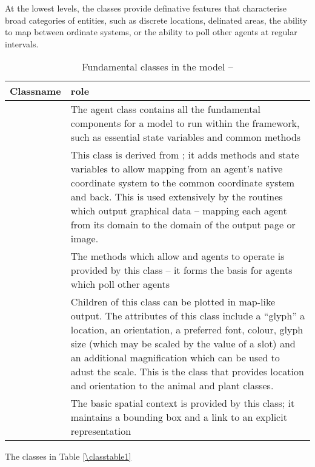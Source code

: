 At the lowest levels, the classes provide definative features that
characterise broad categories of entities, such as discrete locations,
delinated areas, the ability to map between ordinate systems, or the
ability to poll other agents at regular intervals.

\begin{table}[H]
\begin{center}
  \caption{Fundamental classes in the model -- \label{classtable1}}
  \begin{tabular}{l L{7cm}}
    \toprule 
    \textbf{Classname} & \textbf{role} \\
    \midrule
     & The agent class contains all the fundamental
    components for a model to run within the framework, such as
    essential state variables and common methods \\
     & This class is derived from ;
    it adds methods and state variables to allow mapping from an
    agent's native coordinate system to the common coordinate system
    and back. This is used extensively by the routines which output
    graphical data -- mapping each agent from its domain to the domain
    of the output page or image.\\
     & The methods which allow
     and  agents to operate is provided by
    this class -- it forms the basis for agents which poll other agents \\
     & Children of this class can be plotted in
    map-like output. The attributes of this class include a ``glyph''
    a location, an orientation, a preferred font, colour, glyph size
    (which may be scaled by the value of a slot) and an additional
    magnification which can be used to adust the scale.
    This is the class that provides location and orientation to the
    animal and plant classes.\\
     & The basic spatial context is provided by
    this class; it maintains a bounding
    box and a link to an explicit representation\\
    \bottomrule
  \end{tabular}
\end{center}
\end{table}
The classes in Table \ref{\classtable1} 




